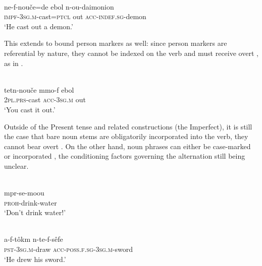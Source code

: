 \documentclass[output=paper]{LSP/langsci}
\begin{document}
\begin{exe}\ex%
\label{05-gr-ex:19}
\\
\gll ne-f-nouče=de ebol n-ou-daimonion\\
\textsc{impf-3sg.m}-cast=\textsc{ptcl} out \textsc{acc-indef.sg}-demon\\
\glt ‘He cast out a demon.’ %
\end{exe}

This extends to bound person markers as well: since person markers are referential by nature, they cannot be indexed on the verb and must receive overt , as in .

\begin{exe}
\ex%
\label{05-gr-ex:20}
\\
\gll tetn-nouče mmo-f ebol\\
\textsc{2pl.prs}-cast \textsc{acc-3sg.m} out\\
\glt ‘You cast it out.’ %
\end{exe}

Outside of the Present tense and related constructions (\eg the Imperfect), it is still the case that bare noun stems are obligatorily incorporated into the verb, \ie they cannot bear overt  . On the other hand, noun phrases can either be case-marked  or incorporated , the conditioning factors governing the alternation still being unclear.

\begin{exe}
\ex%
\label{05-gr-ex:21}
\\
\gll mpr-se-moou\\
\textsc{proh}-drink-water\\
\glt ‘Don’t drink water!’  %
\end{exe}

\begin{exe}\ex%
\label{05-gr-ex:22}
\\
\gll a-f-tôkm n-te-f-sêfe\\
\textsc{pst-3sg.m}-draw \textsc{acc-poss.f.sg-3sg.m}-sword\\
\glt ‘He drew his sword.’  %
\end{exe}
\end{document}
